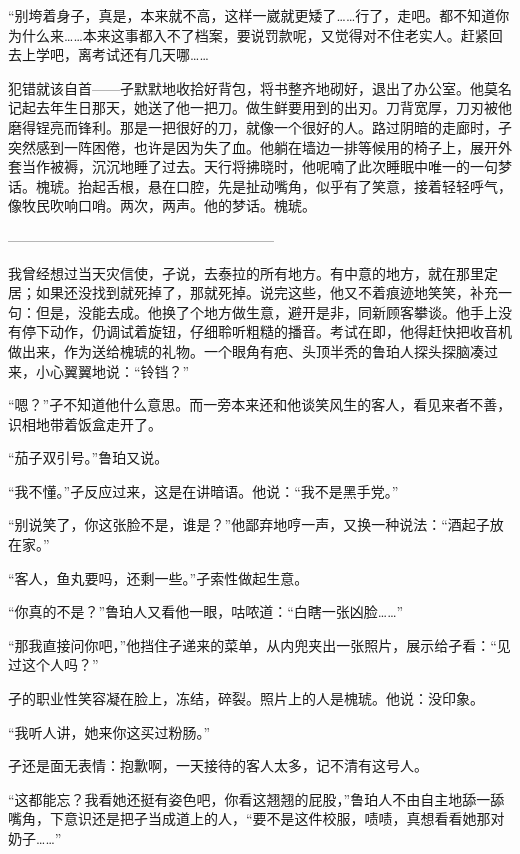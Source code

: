 \documentclass{article}
\begin{document}
“别垮着身子，真是，本来就不高，这样一崴就更矮了……行了，走吧。都不知道你为什么来……本来这事都入不了档案，要说罚款呢，又觉得对不住老实人。赶紧回去上学吧，离考试还有几天哪……

犯错就该自首——孑默默地收拾好背包，将书整齐地砌好，退出了办公室。他莫名记起去年生日那天，她送了他一把刀。做生鲜要用到的出刃。刀背宽厚，刀刃被他磨得锃亮而锋利。那是一把很好的刀，就像一个很好的人。路过阴暗的走廊时，孑突然感到一阵困倦，也许是因为失了血。他躺在墙边一排等候用的椅子上，展开外套当作被褥，沉沉地睡了过去。天行将拂晓时，他呢喃了此次睡眠中唯一的一句梦话。槐琥。抬起舌根，悬在口腔，先是扯动嘴角，似乎有了笑意，接着轻轻呼气，像牧民吹响口哨。两次，两声。他的梦话。槐琥。

———————————————————

\newpage 



我曾经想过当天灾信使，孑说，去泰拉的所有地方。有中意的地方，就在那里定居；如果还没找到就死掉了，那就死掉。说完这些，他又不着痕迹地笑笑，补充一句：但是，没能去成。他换了个地方做生意，避开是非，同新顾客攀谈。他手上没有停下动作，仍调试着旋钮，仔细聆听粗糙的播音。考试在即，他得赶快把收音机做出来，作为送给槐琥的礼物。一个眼角有疤、头顶半秃的鲁珀人探头探脑凑过来，小心翼翼地说：“铃铛？”

“嗯？”孑不知道他什么意思。而一旁本来还和他谈笑风生的客人，看见来者不善，识相地带着饭盒走开了。

“茄子双引号。”鲁珀又说。

“我不懂。”孑反应过来，这是在讲暗语。他说：“我不是黑手党。”

“别说笑了，你这张脸不是，谁是？”他鄙弃地哼一声，又换一种说法：“酒起子放在家。”

“客人，鱼丸要吗，还剩一些。”孑索性做起生意。

“你真的不是？”鲁珀人又看他一眼，咕哝道：“白瞎一张凶脸……”

\newpage 



“那我直接问你吧，”他挡住孑递来的菜单，从内兜夹出一张照片，展示给孑看：“见过这个人吗？”

孑的职业性笑容凝在脸上，冻结，碎裂。照片上的人是槐琥。他说：没印象。

“我听人讲，她来你这买过粉肠。”

孑还是面无表情：抱歉啊，一天接待的客人太多，记不清有这号人。

“这都能忘？我看她还挺有姿色吧，你看这翘翘的屁股，”鲁珀人不由自主地舔一舔嘴角，下意识还是把孑当成道上的人，“要不是这件校服，啧啧，真想看看她那对奶子……”
\end{document}
